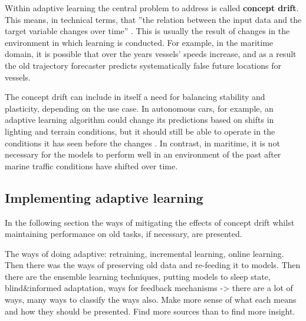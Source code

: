 Within adaptive learning the central problem to address is called \textbf{concept drift}. This means, in technical terms, that ''the relation between the input data and the target variable changes over time'' \cite{conceptdriftsurvey}. This is usually the result of changes in the environment in which learning is conducted. For example, in the maritime domain, it is possible that over the years vessels' speeds increase, and as a result the old trajectory forecaster predicts systematically false future locations for vessels.

The concept drift can include in itself a need for balancing stability and plasticity, depending on the use case. In autonomous cars, for example, an adaptive learning algorithm could change its predictions based on shifts in lighting and terrain conditions, but it should still be able to operate in the conditions it has seen before the changes \cite{conceptdriftsurvey}. In contrast, in maritime, it is not necessary for the models to perform well in an environment of the past after marine traffic conditions have shifted over time.




\subsection{Implementing adaptive learning}

In the following section the ways of mitigating the effects of concept drift whilst maintaining performance on old tasks, if necessary, are presented.

The ways of doing adaptive: retraining, incremental learning, online learning. Then there was the ways of preserving old data and re-feeding it to models. Then there are the ensemble learning techniques, putting models to sleep state, blind&informed adaptation, ways for feedback mechanisms
-> there are a lot of ways, many ways to classify the ways also. Make more sense of what each means and how they should be presented. Find more sources than \cite{conceptdriftsurvey} to find more insight.


